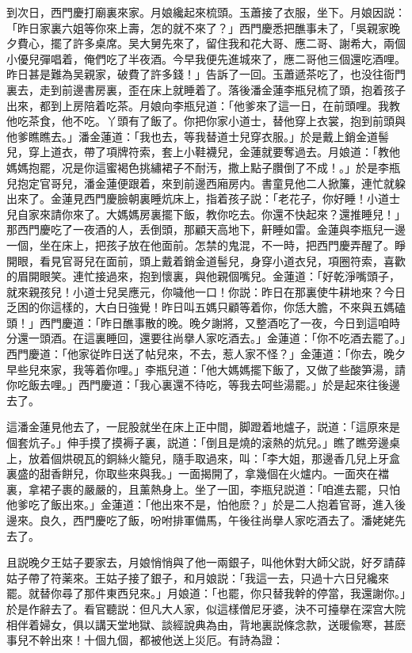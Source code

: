 到次日，西門慶打廟裏來家。月娘纔起來梳頭。玉蕭接了衣服，坐下。月娘因説：「昨日家裏六姐等你來上壽，怎的就不來了？」西門慶悉把醮事未了，「吳親家晚夕費心，擺了許多桌席。吴大舅先來了，留住我和花大哥、應二哥、謝希大，兩個小優兒彈唱着，俺們吃了半夜酒。今早我便先進城來了，應二哥他三個還吃酒哩。昨日甚是難為吴親家，破費了許多錢！」告訴了一回。玉蕭遞茶吃了，也没往衙門裏去，走到前邊書房裏，歪在床上就睡着了。落後潘金蓮李瓶兒梳了頭，抱着孩子出來，都到上房陪着吃茶。月娘向李瓶兒道：「他爹來了這一日，在前頭哩。我教他吃茶食，他不吃。丫頭有了飯了。你把你家小道士，替他穿上衣裳，抱到前頭與他爹瞧瞧去。」潘金蓮道：「我也去，等我替道士兒穿衣服。」於是戴上銷金道髻兒，穿上道衣，帶了項牌符索，套上小鞋襪兒，金蓮就要奪過去。月娘道：「教他媽媽抱罷，况是你這蜜褐色挑繡裙子不耐汚，撒上點子臢倒了不成！。」於是李瓶兒抱定官哥兒，潘金蓮便跟着，來到前邊西廂房内。書童見他二人掀簾，連忙就躱出來了。金蓮見西門慶臉朝裏睡炕床上，指着孩子説：「老花子，你好睡！小道士兒自家來請你來了。大媽媽房裏擺下飯，教你吃去。你還不快起來？還推睡兒！」那西門慶吃了一夜酒的人，丢倒頭，那顧天高地下，鼾睡如雷。金蓮與李瓶兒一邊一個，坐在床上，把孩子放在他面前。怎禁的鬼混，不一時，把西門慶弄醒了。睜開眼，看見官哥兒在面前，頭上戴着銷金道髻兒，身穿小道衣兒，項圈符索，喜歡的眉開眼笑。連忙接過來，抱到懷裏，與他親個嘴兒。金蓮道：「好乾淨嘴頭子，就來親孩兒！小道士兒吴應元，你噦他一口！你説：昨日在那裏使牛耕地來？今日乏困的你這樣的，大白日強覺！昨日叫五媽只顧等着你，你恁大膽，不來與五媽磕頭！」西門慶道：「昨日醮事散的晚。晚夕謝將，又整酒吃了一夜，今日到這咱時分還一頭酒。在這裏睡回，還要往尚擧人家吃酒去。」金蓮道：「你不吃酒去罷了。」西門慶道：「他家従昨日送了帖兒來，不去，惹人家不怪？」金蓮道：「你去，晚夕早些兒來家，我等着你哩。」李瓶兒道：「他大媽媽擺下飯了，又做了些酸笋湯，請你吃飯去哩。」西門慶道：「我心裏還不待吃，等我去呵些湯罷。」於是起來往後邊去了。

這潘金蓮見他去了，一屁股就坐在床上正中間，脚蹬着地爐子，説道：「這原來是個套炕子。」伸手摸了摸褥子裏，説道：「倒且是燒的滚熱的炕兒。」瞧了瞧旁邊桌上，放着個烘硯瓦的銅絲火籠兒，隨手取過來，叫：「李大姐，那邊香几兒上牙盒裏盛的甜香餅兒，你取些來與我。」一面揭開了，拿幾個在火爐内。一面夾在襠裏，拿裙子裹的嚴嚴的，且薰熱身上。坐了一囬，李瓶兒説道：「咱進去罷，只怕他爹吃了飯出來。」金蓮道：「他出來不是，怕他麽？」於是二人抱着官哥，進入後邊來。良久，西門慶吃了飯，吩咐排軍備馬，午後往尚擧人家吃酒去了。潘姥姥先去了。

且説晚夕王姑子要家去，月娘悄悄與了他一兩銀子，叫他休對大師父説，好歹請薛姑子帶了符薬來。王姑子接了銀子，和月娘説：「我這一去，只過十六日兒纔來罷。就替你尋了那件東西兒來。」月娘道：「也罷，你只替我幹的停當，我還謝你。」於是作辭去了。看官聽説：但凡大人家，似這樣僧尼牙婆，決不可擡擧在深宫大院相伴着婦女，俱以講天堂地獄、談經說典為由，背地裏説條念款，送暖偸寒，甚麽事兒不幹出來！十個九個，都被他送上災厄。有詩為證：

